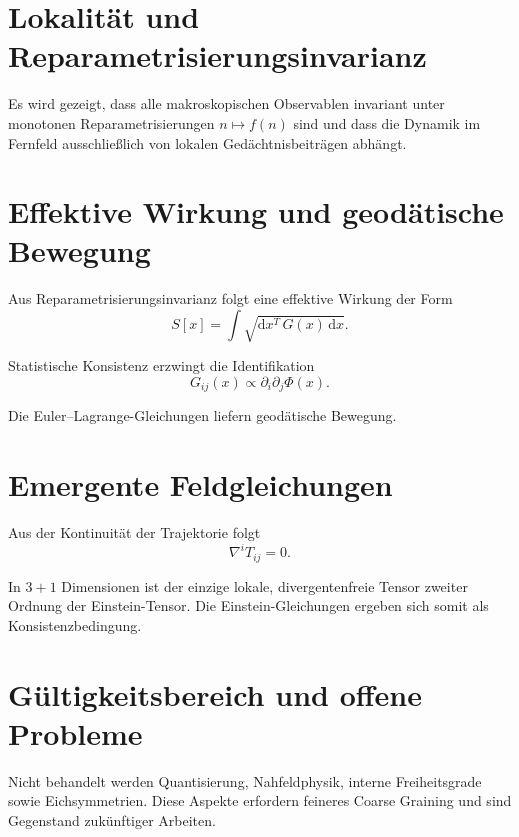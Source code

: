 \documentclass[11pt,a4paper]{article}
\renewcommand{\dd}{\mathrm{d}}
\begin{document}
\section{Lokalit\"at und Reparametrisierungsinvarianz}

Es wird gezeigt, dass alle makroskopischen Observablen invariant unter monotonen Reparametrisierungen $n \mapsto f(n)$ sind und dass die Dynamik im Fernfeld ausschließlich von lokalen Gedächtnisbeiträgen abhängt.

\section{Effektive Wirkung und geod\"atische Bewegung}

Aus Reparametrisierungsinvarianz folgt eine effektive Wirkung der Form
\begin{equation}
 S[x] = \int \sqrt{\dd x^T \, G(x) \, \dd x}.
\end{equation}

Statistische Konsistenz erzwingt die Identifikation
\begin{equation}
 G_{ij}(x) \propto \partial_i \partial_j \Phi(x).
\end{equation}

Die Euler--Lagrange-Gleichungen liefern geodätische Bewegung.

\section{Emergente Feldgleichungen}

Aus der Kontinuität der Trajektorie folgt
\begin{equation}
 \nabla^i T_{ij} = 0.
\end{equation}

In $3+1$ Dimensionen ist der einzige lokale, divergentenfreie Tensor zweiter Ordnung der Einstein-Tensor. Die Einstein-Gleichungen ergeben sich somit als Konsistenzbedingung.

\section{G\"ultigkeitsbereich und offene Probleme}

Nicht behandelt werden Quantisierung, Nahfeldphysik, interne Freiheitsgrade sowie Eichsymmetrien. Diese Aspekte erfordern feineres Coarse Graining und sind Gegenstand zukünftiger Arbeiten.
\end{document}
